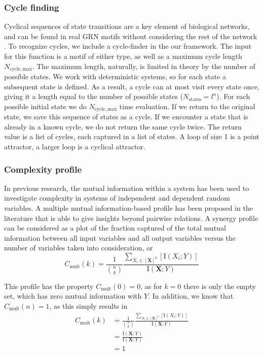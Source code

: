\documentclass[../main.tex]{subfiles}
\begin{document}
\subsubsection{Cycle finding}

Cyclical sequences of state transitions are a key element of biological networks, and can be found in real GRN motifs without considering the rest of the network \cite{burda2011motifs}.
To recognize cycles, we include a cycle-finder in the our framework.
The input for this function is a motif of either type, as well as a maximum cycle length $N_\mathrm{cycle,max}$.
The maximum length, naturally, is limited in theory by the number of possible states.
We work with deterministic systems, so for each state a subsequent state is defined.
As a result, a cycle can at most visit every state once, giving it a length equal to the number of possible states ($N_\mathrm{states} = l^n$).
For each possible initial state we do $N_\mathrm{cycle,max}$ time evaluation.
If we return to the original state, we save this sequence of states as a cycle.
If we encounter a state that is already in a known cycle, we do not return the same cycle twice.
The return value is a list of cycles, each captured in a list of states.
A loop of size 1 is a point attractor, a larger loop is a cyclical attractor. 

\subsubsection{Complexity profile}

In previous research, the mutual information within a system has been used to investigate complexity in systems of independent and dependent random variables.
A multiple mutual information-based profile has been proposed in the literature that is able to give insights beyond pairwise relations.
A synergy profile can be considered as a plot of the fraction captured of the total mutual information between all input variables and all output variables versus the number of variables taken into consideration, or
%
\begin{equation}
C_\mathrm{mult}(k) = \frac{1}{\binom{n}{k}}\frac{\sum_{X_i \in [\mathbf{X}]^k} [\mathrm{I}\left( X_i;Y \right)]}{\mathrm{I}\left( \mathbf{X};Y\right)}
\end{equation}

This profile has the property $C_\mathrm{mult}\left( 0 \right) = 0$, as for $k = 0$ there is only the empty set, which has zero mutual information with $Y$.
In addition, we know that $C_\mathrm{mult}\left( n\right) = 1$, as this simply results in
%
\begin{align}
C_\mathrm{mult}\left( k \right)  
&= \frac{1}{\binom{n}{k}}\frac{\sum_{X_i \in [\mathbf{X}]^k} [\mathrm{I}\left( X_i;Y\right)]}{\mathrm{I}\left( \mathbf{X};Y\right)} \\
&= \frac{\mathrm{I}\left( \mathbf{X};Y\right)}{\mathrm{I}\left( \mathbf{X};Y\right)} \\
&= 1
\end{align}
\end{document}

